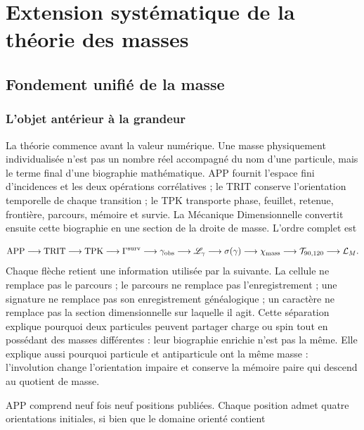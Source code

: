 \chapter{Extension systématique de la théorie des masses}
\section{Fondement unifié de la masse}
\subsection{L'objet antérieur à la grandeur}
La théorie commence avant la valeur numérique. Une masse physiquement individualisée n'est pas un nombre réel accompagné du nom d'une particule, mais le terme final d'une biographie mathématique. APP fournit l'espace fini d'incidences et les deux opérations corrélatives ; le TRIT conserve l'orientation temporelle de chaque transition ; le TPK transporte phase, feuillet, retenue, frontière, parcours, mémoire et survie. La Mécanique Dimensionnelle convertit ensuite cette biographie en une section de la droite de masse. L'ordre complet est

\[
\mathrm{APP}\longrightarrow\mathrm{TRIT}\longrightarrow\mathrm{TPK}
\longrightarrow\Gamma^{\rm surv}
\longrightarrow\gamma_{\rm obs}
\longrightarrow\mathscr L_\gamma
\longrightarrow\sigma(\gamma)
\longrightarrow\chi_{\rm mass}
\longrightarrow\mathcal T_{90,120}
\longrightarrow\mathcal L_M.
\]
Chaque flèche retient une information utilisée par la suivante. La cellule ne remplace pas le parcours ; le parcours ne remplace pas l'enregistrement ; une signature ne remplace pas son enregistrement généalogique ; un caractère ne remplace pas la section dimensionnelle sur laquelle il agit. Cette séparation explique pourquoi deux particules peuvent partager charge ou spin tout en possédant des masses différentes : leur biographie enrichie n'est pas la même. Elle explique aussi pourquoi particule et antiparticule ont la même masse : l'involution change l'orientation impaire et conserve la mémoire paire qui descend au quotient de masse.

APP comprend neuf fois neuf positions publiées. Chaque position admet quatre orientations initiales, si bien que le domaine orienté contient

